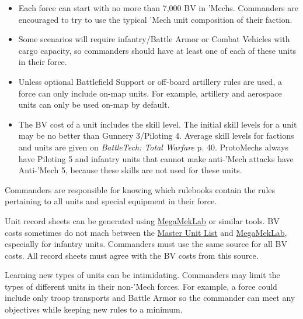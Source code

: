 \begin{itemize}
\item Each force can start with no more than 7,000 BV in 'Mechs.
Commanders are encouraged to try to use the typical 'Mech unit composition of their faction.

\item Some scenarios will require infantry/Battle Armor or Combat Vehicles with cargo capacity, so commanders should have at least one of each of these units in their force.

\item Unless optional Battlefield Support or off-board artillery rules are used, a force can only include on-map units.
For example, artillery and aerospace units can only be used on-map by default.

\item The BV cost of a unit includes the skill level.
The initial skill levels for a unit may be no better than Gunnery 3/Piloting 4.
Average skill levels for factions and units are given on \emph{BattleTech: Total Warfare} p. 40.
ProtoMechs always have Piloting 5 and infantry units that cannot make anti-'Mech attacks have Anti-'Mech 5, because these skills are not used for these units.

\end{itemize}

Commanders are responsible for knowing which rulebooks contain the rules pertaining to all units and special equipment in their force.

Unit record sheets can be generated using \href{https://megamek.org}{MegaMekLab} or similar tools.
BV costs sometimes do not mach between the \href{http://www.masterunitlist.info}{Master Unit List} and \href{https://megamek.org}{MegaMekLab}, especially for infantry units.
Commanders must use the same source for all BV costs.
All record sheets must agree with the BV costs from this source.

Learning new types of units can be intimidating.
Commanders may limit the types of different units in their non-'Mech forces.
For example, a force could include only troop transports and Battle Armor so the commander can meet any objectives while keeping new rules to a minimum.
